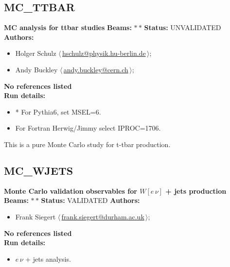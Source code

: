 \subsection{MC\_TTBAR}
\textbf{MC analysis for ttbar studies}\newline
\textbf{Beams:} $*$\,$*$ \newline
\textbf{Status:} UNVALIDATED\newline
\textbf{Authors:}
\begin{itemize}
  \item Holger Schulz $\langle\,$\href{mailto:hschulz@physik.hu-berlin.de}{hschulz@physik.hu-berlin.de}$\,\rangle$;
  \item Andy Buckley $\langle\,$\href{mailto:andy.buckley@cern.ch}{andy.buckley@cern.ch}$\,\rangle$;
\end{itemize}
\textbf{No references listed}\\ 
\textbf{Run details:}
\begin{itemize}

  \item * For Pythia6, set MSEL=6.
  \item For Fortran Herwig/Jimmy select IPROC=1706.\end{itemize}

\noindent This is a pure Monte Carlo study for t-tbar production.

\clearpage


\clearpage

\subsection{MC\_WJETS}
\textbf{Monte Carlo validation observables for $W[e \, \nu]$ + jets production}\newline
\textbf{Beams:} $*$\,$*$ \newline
\textbf{Status:} VALIDATED\newline
\textbf{Authors:}
\begin{itemize}
  \item Frank Siegert $\langle\,$\href{mailto:frank.siegert@durham.ac.uk}{frank.siegert@durham.ac.uk}$\,\rangle$;
\end{itemize}
\textbf{No references listed}\\ 
\textbf{Run details:}
\begin{itemize}

  \item $e \, \nu$ + jets analysis.\end{itemize}

